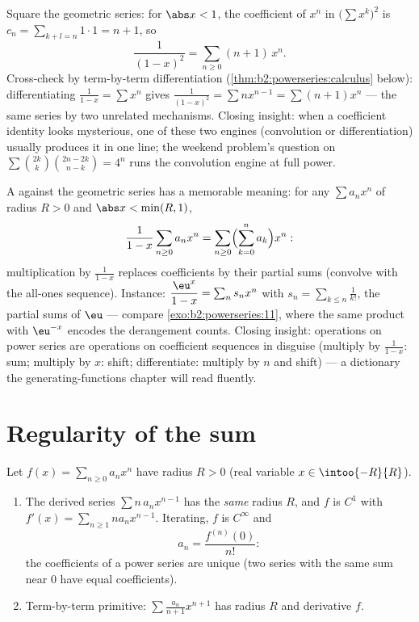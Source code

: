 \begin{example}\label{ex:b2:powerseries:cauchysquare}
Square the geometric series: for $\abs x < 1$, the coefficient
of $x^n$ in $\bigl(\sum x^k\bigr)^2$ is $c_n = \sum_{k+l=n}
1\cdot1 = n + 1$, so
\[
\frac{1}{(1-x)^2} = \sum_{n\geq0}(n+1)\,x^n .
\]
Cross-check by term-by-term differentiation
(\cref{thm:b2:powerseries:calculus} below): differentiating
$\frac{1}{1-x} = \sum x^n$ gives $\frac{1}{(1-x)^2} = \sum
nx^{n-1} = \sum(n+1)x^n$ --- the same series by two unrelated
mechanisms. Closing insight: when a coefficient identity looks
mysterious, one of these two engines (convolution or
differentiation) usually produces it in one line; the weekend
problem's question on $\sum\binom{2k}k\binom{2n-2k}{n-k} = 4^n$
runs the convolution engine at full power.
\end{example}

\begin{example}\label{ex:b2:powerseries:partialsums}
A  against the geometric series has a memorable
meaning: for any $\sum a_nx^n$ of radius $R > 0$ and $\abs x <
\min(R, 1)$,
\[
\frac{1}{1-x}\sum_{n\geq0}a_nx^n
= \sum_{n\geq0}\Bigl(\sum_{k=0}^{n}a_k\Bigr)x^n :
\]
multiplication by $\frac{1}{1-x}$ replaces coefficients by
their partial sums (convolve with the all-ones sequence).
Instance: $\dfrac{\eu^x}{1-x} = \sum_n s_n x^n$ with $s_n =
\sum_{k\leq n}\frac{1}{k!}$, the partial sums of $\eu$ ---
compare \cref{exo:b2:powerseries:11}, where the same product
with $\eu^{-x}$ encodes the derangement counts. Closing
insight: operations on power series are operations on
coefficient sequences in disguise (multiply by $\frac1{1-x}$:
sum; multiply by $x$: shift; differentiate: multiply by $n$
and shift) --- a dictionary the generating-functions chapter
will read fluently.
\end{example}

\section{Regularity of the sum}

\begin{theorem}\label{thm:b2:powerseries:calculus}
Let $f(x) = \sum_{n\geq0} a_n x^n$ have radius $R > 0$ (real
variable $x \in \intoo{-R}{R}$).
\begin{enumerate}
  \item The derived series $\sum n\,a_n x^{n-1}$ has the \emph{same}
        radius $R$, and $f$ is $C^1$ with $f'(x) = \sum_{n \geq 1}
        n a_n x^{n-1}$. Iterating, $f$ is $C^\infty$ and
        \[
        a_n = \frac{f^{(n)}(0)}{n!} :
        \]
        the coefficients of a power series are unique (two series
        with the same sum near $0$ have equal coefficients).
  \item Term-by-term primitive: $\sum \frac{a_n}{n+1}x^{n+1}$ has
        radius $R$ and derivative $f$.
\end{enumerate}
\end{theorem}

